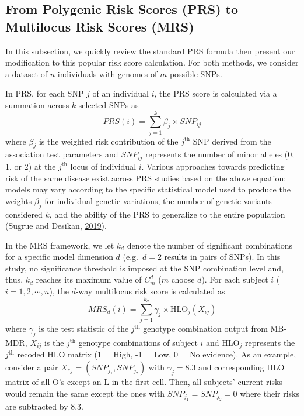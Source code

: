 \documentclass{ws-procs11x85}
\begin{document}
\subsection{From Polygenic Risk Scores (PRS) to Multilocus Risk
Scores
(MRS)}\label{from-polygenic-risk-scores-prs-to-multilocus-risk-scores-mrs}

In this subsection, we quickly review the standard PRS formula then
present our modification to this popular risk score calculation. For
both methods, we consider a dataset of \(n\) individuals with genomes of
\(m\) possible SNPs.

In PRS, for each SNP \(j\) of an individual \(i\), the PRS score is
calculated via a summation across \(k\) selected SNPs as
\[PRS(i)=\sum_{j=1}^{k} \beta_j \times SNP_{ij}\] where \(\beta_j\) is
the weighted risk contribution of the \(j^\textrm{th}\) SNP derived from
the association test parameters and \(SNP_{ij}\) represents the number
of minor alleles (0, 1, or 2) at the \(j^\textrm{th}\) locus of
individual \(i\). Various approaches towards predicting risk of the same
disease exist across PRS studies based on the above equation; models may
vary according to the specific statistical model used to produce the
weights \(\beta_j\) for individual genetic variations, the number of
genetic variants considered \(k\), and the ability of the PRS to
generalize to the entire population (Sugrue and Desikan,
\protect\hyperlink{ref-1Dlv3tAGh}{2019}).

In the MRS framework, we let \(k_d\) denote the number of significant
combinations for a specific model dimension \(d\) (e.g.~\(d = 2\)
results in pairs of SNPs). In this study, no significance threshold is
imposed at the SNP combination level and, thus, \(k_d\) reaches its
maximum value of \(C^d_m\) (\(m\) choose \(d\)). For each subject \(i\)
(\(i = 1,2, \dotsm, n\)), the \(d\)-way multilocus risk score is
calculated as
\[MRS_d(i) = \sum_{j = 1}^{k_d} \gamma_j \times \textrm{HLO}_j(X_{ij})\]
where \(\gamma_j\) is the test statistic of the \(j^\textrm{th}\)
genotype combination output from MB-MDR, \(X_{ij}\) is the
\(j^\textrm{th}\) genotype combinations of subject \(i\) and
\(\textrm{HLO}_j\) represents the \(j^\textrm{th}\) recoded HLO matrix
(1 = High, -1 = Low, 0 = No evidence). As an example, consider a pair
\(X_{*j} = (SNP_{j_1}, SNP_{j_2})\) with \(\gamma_j=8.3\) and
corresponding HLO matrix of all O's except an L in the first cell. Then,
all subjects' current risks would remain the same except the ones with
\(SNP_{j_1} = SNP_{j_2} = 0\) where their risks are subtracted by 8.3.
\end{document}
